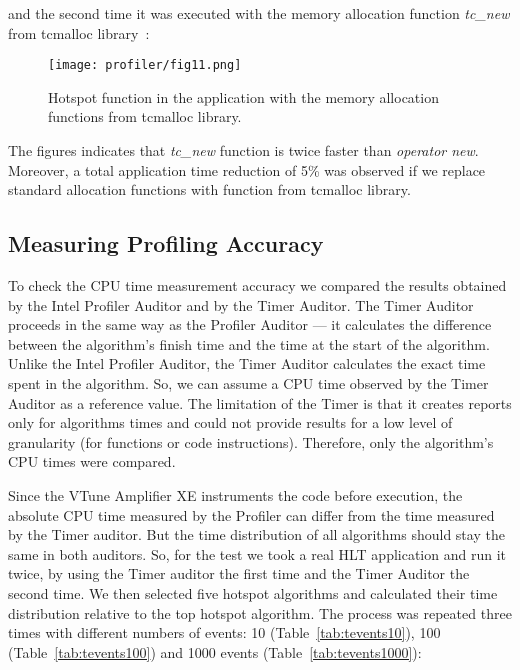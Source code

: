 \noindent and the second time it was executed with the memory allocation function {\it
tc\_new} from tcmalloc library~\cite{perftools}:

\begin{figure}[H]
\texttt{[image: profiler/fig11.png]}
\caption{Hotspot function in the \moore application with the memory allocation functions from tcmalloc 
library.}
\label{fig11}
\end{figure}

The figures indicates that {\it tc\_new} function is twice faster than {\it
operator new}. Moreover, a total application time reduction of 5\% was
observed if we replace standard allocation functions with function from
tcmalloc library.

\subsection{Measuring Profiling Accuracy}
\label{sec:accuracy}
To check the CPU time measurement accuracy we compared the results obtained by
the \gaudi Intel Profiler Auditor and by the \gaudi Timer Auditor. The Timer
Auditor proceeds in the same way as the Profiler Auditor --- it calculates the
difference between the algorithm's finish time and the time at the start of the
algorithm. Unlike the \gaudi Intel Profiler Auditor, the Timer Auditor
calculates the exact time spent in the algorithm. So, we can assume a CPU time
observed by the Timer Auditor as a reference value. The limitation of the Timer
is that it creates reports only for algorithms times  and could not provide
results for a low level of granularity (for functions or code instructions).
Therefore, only the algorithm's CPU times were compared.

Since the VTune Amplifier XE instruments the code before execution, the
absolute CPU time measured by the Profiler can differ from the time measured by
the Timer auditor.  But the time distribution of all algorithms should stay the
same in both auditors.  So, for the test we took a real HLT application and run
it twice, by using the Timer auditor the first time and the \gaudi Timer Auditor 
the second time. We then selected five hotspot algorithms and
calculated their time distribution relative to the top hotspot algorithm. The
process was repeated three times with different numbers of events: 10
(Table~\ref{tab:tevents10}), 100 (Table~\ref{tab:tevents100}) and 1000 events
(Table~\ref{tab:tevents1000}):

